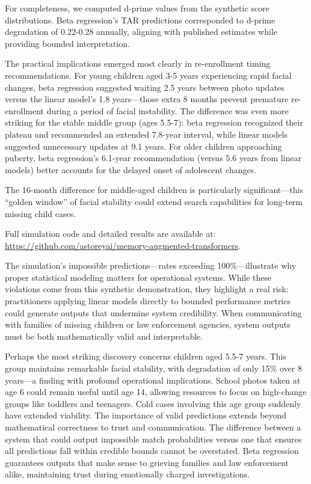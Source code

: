 \documentclass[10pt,journal,compsoc]{IEEEtran}
\begin{document}
For completeness, we computed d-prime values from the synthetic score distributions. Beta regression's TAR predictions corresponded to d-prime degradation of 0.22-0.28 annually, aligning with published estimates while providing bounded interpretation.

The practical implications emerged most clearly in re-enrollment timing recommendations. For young children aged 3-5 years experiencing rapid facial changes, beta regression suggested waiting 2.5 years between photo updates versus the linear model's 1.8 years---those extra 8 months prevent premature re-enrollment during a period of facial instability. The difference was even more striking for the stable middle group (ages 5.5-7): beta regression recognized their plateau and recommended an extended 7.8-year interval, while linear models suggested unnecessary updates at 9.1 years. For older children approaching puberty, beta regression's 6.1-year recommendation (versus 5.6 years from linear models) better accounts for the delayed onset of adolescent changes.

The 16-month difference for middle-aged children is particularly significant---this ``golden window'' of facial stability could extend search capabilities for long-term missing child cases.

Full simulation code and detailed results are available at: \url{https://github.com/astoreyai/memory-augmented-transformers}.

The simulation's impossible predictions---rates exceeding 100\%---illustrate why proper statistical modeling matters for operational systems. While these violations come from this synthetic demonstration, they highlight a real risk: practitioners applying linear models directly to bounded performance metrics could generate outputs that undermine system credibility. When communicating with families of missing children or law enforcement agencies, system outputs must be both mathematically valid and interpretable.

Perhaps the most striking discovery concerns children aged 5.5-7 years. This group maintains remarkable facial stability, with degradation of only 15\% over 8 years---a finding with profound operational implications. School photos taken at age 6 could remain useful until age 14, allowing resources to focus on high-change groups like toddlers and teenagers. Cold cases involving this age group suddenly have extended viability. The importance of valid predictions extends beyond mathematical correctness to trust and communication. The difference between a system that could output impossible match probabilities versus one that ensures all predictions fall within credible bounds cannot be overstated. Beta regression guarantees outputs that make sense to grieving families and law enforcement alike, maintaining trust during emotionally charged investigations.
\end{document}
